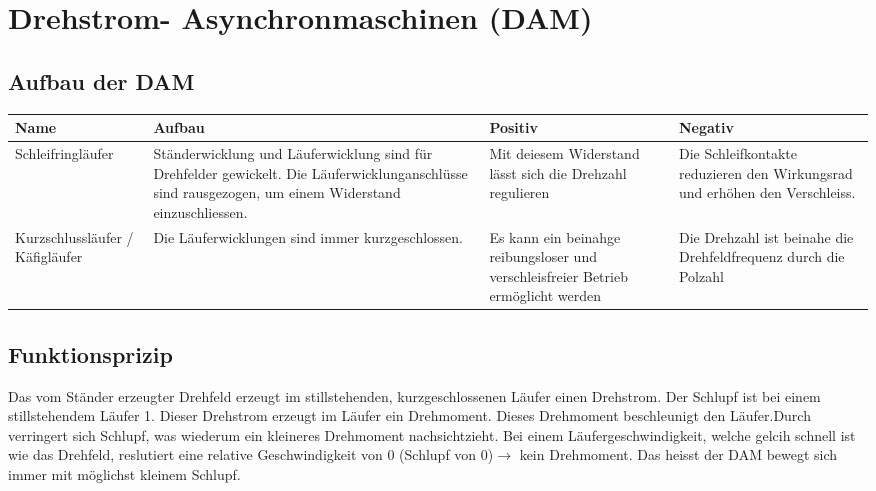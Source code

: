 \section{Drehstrom- Asynchronmaschinen (DAM)}
    \subsection{Aufbau der DAM}
        \begin{tabular}[c]{| p{3cm} | p{5cm} | p{4cm} | p{5cm} |}
            \hline
            Name &
            Aufbau &
            Positiv &
            Negativ \\
            \hline
            Schleifringläufer &
            Ständerwicklung und Läuferwicklung sind für Drehfelder gewickelt. Die Läuferwicklunganschlüsse sind rausgezogen, um einem Widerstand einzuschliessen. &
            Mit deiesem Widerstand lässt sich die Drehzahl regulieren &
            Die Schleifkontakte reduzieren den Wirkungsrad und erhöhen den Verschleiss. \\
            \hline
            Kurzschlussläufer / Käfigläufer &
            Die Läuferwicklungen sind immer kurzgeschlossen. &
            Es kann ein beinahge reibungsloser und verschleisfreier Betrieb ermöglicht werden &
            Die Drehzahl ist beinahe die Drehfeldfrequenz durch die Polzahl \\
            \hline
        \end{tabular}
    \subsection{Funktionsprizip}
        Das vom Ständer erzeugter Drehfeld erzeugt im stillstehenden, kurzgeschlossenen Läufer einen Drehstrom. Der Schlupf ist bei einem stillstehendem Läufer 1. Dieser Drehstrom erzeugt im Läufer ein Drehmoment. Dieses Drehmoment beschleunigt den Läufer.Durch verringert sich Schlupf, was wiederum ein kleineres Drehmoment nachsichtzieht. Bei einem Läufergeschwindigkeit, welche gelcih schnell ist wie das Drehfeld, reslutiert eine relative Geschwindigkeit von 0 (Schlupf von 0)$\rightarrow $ kein Drehmoment. Das heisst der DAM bewegt sich immer mit möglichst kleinem Schlupf.

